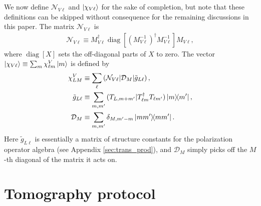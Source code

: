 \documentclass[nofootinbib,twocolumn]{revtex4-1}
\newcommand{\p}[1]{\left(#1\right)} %
\renewcommand{\sp}[1]{\left[#1\right]} %
\newcommand{\D}{\mathcal{D}}
\newcommand{\N}{\mathcal{N}}
\def\obk#1{\mathinner{({#1})}}
\DeclareMathOperator{\diag}{diag}
\begin{document}
We now define $\N_{V\ell}$ and $\ket{\chi_{V\ell}}$ for the sake of completion, but note that these definitions can be skipped without consequence for the remaining discussions in this paper.
The matrix $\N_{V\ell}$ is
\begin{align}
  \N_{V\ell} \equiv M_{V\ell}^\dag
  \diag\sp{\p{M_{V\ell}^{-1}}^\dag M_{V\ell}^{-1}} M_{V\ell},
\end{align}
where $\diag\sp{X}$ sets the off-diagonal parts of $X$ to zero.
The vector $\ket{\chi_{V\ell}}\equiv\sum_m \chi^V_{\ell m} \ket{m}$ is defined by
\begin{align}
  \chi^V_{LM} &\equiv
  \sum_\ell \obk{\N_{V\ell}|\D_M|\tilde g_{L\ell}}, \\
  \tilde g_{L\ell} &\equiv \sum_{m,m'}
  \obk{T_{L,m+m'}|T_{\ell m}^\dag T_{\ell m'}} \op{m}{m'}, \\
  \D_M &\equiv \sum_{m,m'} \delta_{M,m'-m} \op{mm'}.
\end{align}
Here $\tilde g_{L\ell}$ is essentially a matrix of structure constants for the polarization operator algebra (see Appendix \ref{sec:trans_prod}), and $\D_M$ simply picks off the $M$-th diagonal of the matrix it acts on.

\section{Tomography protocol}
\label{sec:protocol}

\end{document}
